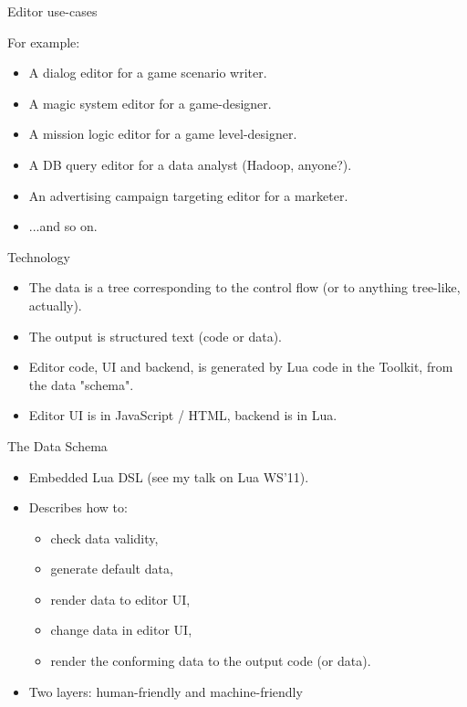 \documentclass[handout]{beamer}
\begin{document}

\begin{frame}{Editor use-cases}

For example:

\begin{itemize}
\item A dialog editor for a game scenario writer.
\item A magic system editor for a game-designer.
\item A mission logic editor for a game level-designer.
\item A DB query editor for a data analyst (Hadoop, anyone?).
\item An advertising campaign targeting editor for a marketer.
\item ...and so on.
\end{itemize}

\end{frame}


\begin{frame}{Technology}

\begin{itemize}
\item The data is a tree corresponding to the control flow (or to
anything tree-like, actually).
\item The output is structured text (code or data).
\item Editor code, UI and backend, is generated by Lua code in the
Toolkit, from the data "schema".
\item Editor UI is in JavaScript / HTML, backend is in Lua.
\end{itemize}

\end{frame}


\begin{frame}{The Data Schema}

\begin{itemize}
\item Embedded Lua DSL (see my talk on Lua WS'11).
\item Describes how to:
\begin{itemize}
 \item check data validity,
 \item generate default data,
 \item render data to editor UI,
 \item change data in editor UI,
 \item render the conforming data to the output code (or data).
\end{itemize}
\item Two layers: human-friendly and machine-friendly
\end{itemize}

\end{frame}
\end{document}
